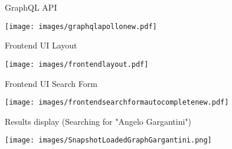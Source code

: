 \documentclass[aspectratio = 169, 15pt]{beamer}
\begin{document}
    \begin{frame}{GraphQL API}
        \begin{center}
            \vspace*{-3cm}
            \hspace*{-0.3cm}
            \texttt{[image: images/graphqlapollonew.pdf]}
        \end{center}
    \end{frame}
    
    \begin{frame}{Frontend UI Layout}
        \begin{center}
            \vspace*{-0.6cm}
            \texttt{[image: images/frontendlayout.pdf]}
        \end{center}
    \end{frame}
    
    \begin{frame}{Frontend UI Search Form}
        \begin{center}
            \vspace*{-1.6cm}
            \hspace*{-1cm}
            \texttt{[image: images/frontendsearchformautocompletenew.pdf]}
        \end{center}
    \end{frame}
    
    \begin{frame}{Results display (Searching for "Angelo Gargantini")}
        \begin{center}
            \vspace*{-0.83cm}
            \hspace*{-1.06cm}
            \texttt{[image: images/SnapshotLoadedGraphGargantini.png]}
        \end{center}
    \end{frame}
    
\end{document}
